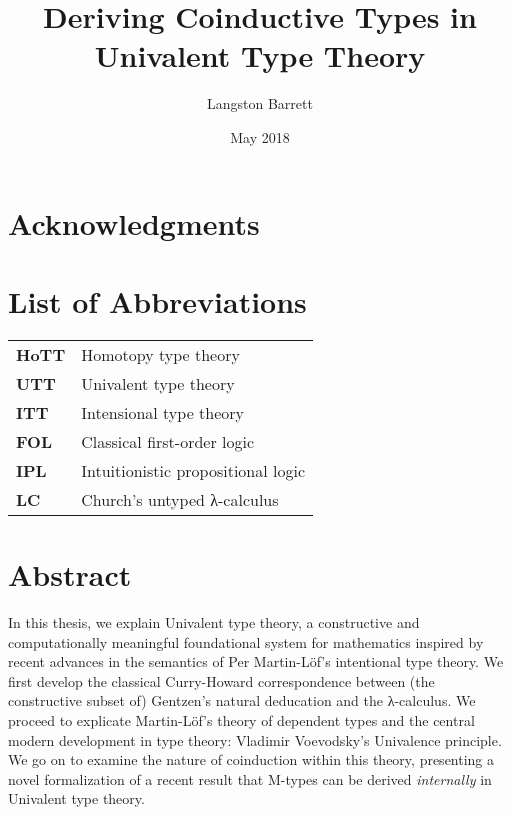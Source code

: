 \documentclass[12pt,twoside,draft]{reedthesis}
\title{Deriving Coinductive Types in Univalent Type Theory}
\author{Langston Barrett}
\date{May 2018}
\begin{document}
\maketitle
\frontmatter %
\pagestyle{empty} %

\chapter*{Acknowledgments}


\chapter*{List of Abbreviations}

\begin{table}[h]
  \centering
  \begin{tabular}{ll}
    \textbf{HoTT}  	&  Homotopy type theory \\
    \textbf{UTT}  	&  Univalent type theory \\
    \textbf{ITT}  	&  Intensional type theory \\
    \textbf{FOL}  	&  Classical first-order logic \\
    \textbf{IPL}  	&  Intuitionistic propositional logic \\
    \textbf{LC}  	  &  Church's untyped λ-calculus
  \end{tabular}
\end{table}

\setcounter{tocdepth}{4}
\tableofcontents

\chapter*{Abstract}

In this thesis, we explain Univalent type theory, a constructive and
computationally meaningful foundational system for mathematics inspired by
recent advances in the semantics of Per Martin-L\"of's intentional type theory.
We first develop the classical Curry-Howard correspondence between (the
constructive subset of) Gentzen's natural deducation and the λ-calculus.
We proceed to explicate Martin-L\"of's theory of dependent types and the central
modern development in type theory: Vladimir Voevodsky's Univalence principle.
We go on to examine the nature of coinduction within this theory, presenting a
novel formalization of a recent result that M-types can be derived
\textit{internally} in Univalent type theory.
\end{document}
